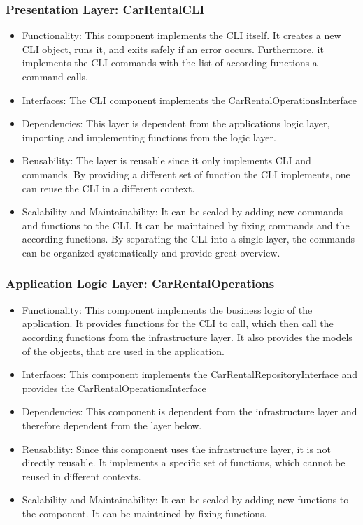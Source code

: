 \subsubsection*{Presentation Layer: CarRentalCLI}
\begin{itemize}
    \item Functionality: This component implements the CLI itself. 
          It creates a new CLI object, runs it, and exits safely if an error occurs.
          Furthermore, it implements the CLI commands with the list of according functions a command calls.
    \item Interfaces: The CLI component implements the CarRentalOperationsInterface
    \item Dependencies: This layer is dependent from the applications logic layer, importing and implementing functions from the logic layer.
    \item Reusability: The layer is reusable since it only implements CLI and commands.
          By providing a different set of function the CLI implements, one can reuse the CLI in a different context.
    \item Scalability and Maintainability: It can be scaled by adding new commands and functions to the CLI.
          It can be maintained by fixing commands and the according functions.
          By separating the CLI into a single layer, the commands can be organized systematically and provide great overview.
\end{itemize}

\subsubsection*{Application Logic Layer: CarRentalOperations}
\begin{itemize}
    \item Functionality: This component implements the business logic of the application.
          It provides functions for the CLI to call, which then call the according functions from the infrastructure layer.
          It also provides the models of the objects, that are used in the application.
    \item Interfaces: This component implements the CarRentalRepositoryInterface and provides the CarRentalOperationsInterface
    \item Dependencies: This component is dependent from the infrastructure layer and therefore dependent from the layer below.
    \item Reusability: Since this component uses the infrastructure layer, it is not directly reusable.
          It implements a specific set of functions, which cannot be reused in different contexts.
    \item Scalability and Maintainability: It can be scaled by adding new functions to the component.
          It can be maintained by fixing functions.
\end{itemize}

